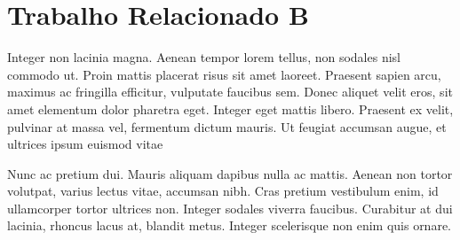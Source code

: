 \section{Trabalho Relacionado B}
\label{sec:trabalho-relacionado-b}

Integer non lacinia magna. Aenean tempor lorem tellus, non sodales nisl commodo ut. Proin mattis placerat risus sit amet laoreet. Praesent sapien arcu, maximus ac fringilla efficitur, vulputate faucibus sem. Donec aliquet velit eros, sit amet elementum dolor pharetra eget. Integer eget mattis libero. Praesent ex velit, pulvinar at massa vel, fermentum dictum mauris. Ut feugiat accumsan augue, et ultrices ipsum euismod vitae

	\begin{figure}[ht!]
		\centering
	\end{figure}

Nunc ac pretium dui. Mauris aliquam dapibus nulla ac mattis. Aenean non tortor volutpat, varius lectus vitae, accumsan nibh. Cras pretium vestibulum enim, id ullamcorper tortor ultrices non. Integer sodales viverra faucibus. Curabitur at dui lacinia, rhoncus lacus at, blandit metus. Integer scelerisque non enim quis ornare.

	\begin{quadro}[ht!]	
		\centering
	\end{quadro}
	
